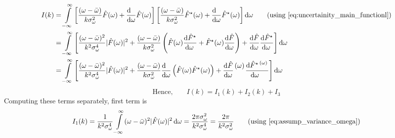 \documentclass[11pt, a4paper]{article}
\newcommand{\numerator}[1]{\genfrac{}{}{0pt}{}{#1}{}}
\newcommand{\eqrefnp}[1]{\textup{\ref{#1}}}
\newcommand{\variance}[1]{\sigma_{#1}^{2}}
\newcommand{\stdev}[1]{\sigma_{#1}}
\newcommand{\diff}{\mathop{}\!\mathrm{d}}
\newcommand{\domega}{\diff \omega}
\newcommand{\derv}[1]{\frac{\diff \hfill}{\diff #1}}	%
\newcommand{\dervb}[2]{\derv{#1} \left(#2\right)}  %
\newcommand{\dervf}[2]{\frac{\diff #2}{\diff #1 \hfil}}	%
\newcommand{\dint}[2]{\int \limits_{#1}^{#2}}  %
\newcommand{\intinfty}{\dint{-\infty}{\infty}}	%
\begin{document}
\begin{align*}
	I(k) & = \intinfty \left[\frac{(\omega - \bar{\omega})}{k \variance{\omega}} \hat{F}(\omega) + \derv{\omega}\hat{F}(\omega)\right] \left[\frac{(\omega - \bar{\omega})}{k \variance{\omega}} \hat{F}^{\star}(\omega) + \derv{\omega}\hat{F}^{\star}(\omega)\right] \domega \tag{using \eqrefnp{eq:uncertainity_main_functionl}} \\
	& = \intinfty \left[\frac{(\omega - \bar{\omega})^{2}}{k^{2} \stdev{\omega}^{4}} |\hat{F}(\omega)|^{2} + \frac{(\omega - \bar{\omega})}{k \variance{\omega}}\left(\hat{F}(\omega) \dervf{\omega}{\hat{F}^{\star}} + \hat{F}^{\star}(\omega) \dervf{\omega}{\hat{F}} \right) + \dervf{\omega}{\hat{F}} \dervf{\omega}{\hat{F}^{\star}}
	\right] \domega \\
	& = \intinfty \left[\frac{(\omega - \bar{\omega})^{2}}{k^{2} \stdev{\omega}^{4}} |\hat{F}(\omega)|^{2} + \frac{(\omega - \bar{\omega})}{k \variance{\omega}}\dervb{\omega}{\hat{F}(\omega) \hat{F}^{\star}(\omega)} + \dervf{\omega}{\hat{F}}\numerator{(\omega)} \dervf{\omega}{\hat{F}^{\star}\numerator{(\omega)}}
	\right] \domega
\end{align*}
\begin{equation}\label{eq:uncertainty_integral_triplet}
	\text{Hence,} \qquad I(k) = I_{1}(k) + I_{2}(k) + I_{3}
\end{equation}
Computing these terms separately, first term is
\begin{equation}\label{eq:uncertainty_integral_part1}
	I_{1}(k) = \frac{1}{k^{2} \stdev{\omega}^{4}} \intinfty (\omega - \bar{\omega})^{2} |\hat{F}(\omega)|^{2} \domega = \frac{2 \pi \variance{\omega}}{k^{2} \stdev{\omega}^{4}} = \frac{2\pi}{k^{2} \variance{\omega}} \qquad \text{(using \eqrefnp{eq:assump_variance_omega})}
\end{equation}
\end{document}
